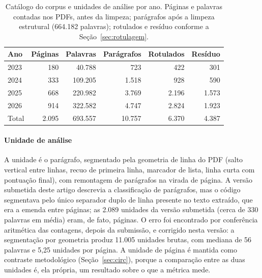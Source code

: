 \documentclass[fleqn,10pt]{SelfArx}
\begin{document}
\begin{table}[hbt]
\caption{Catálogo do corpus e unidades de análise por ano. Páginas e palavras contadas nos PDFs, antes da limpeza; parágrafos após a limpeza estrutural (664.182 palavras); rotulados e resíduo conforme a Seção~\ref{sec:rotulagem}.}
\label{tab:corpus}
\centering
\footnotesize
\begin{tabular}{lrrrrr}
\toprule
Ano & Páginas & Palavras & Parágrafos & Rotulados & Resíduo \\
\midrule
2023 & 180 & 40.788 & 723 & 422 & 301 \\
2024 & 333 & 109.205 & 1.518 & 928 & 590 \\
2025 & 668 & 220.982 & 3.769 & 2.196 & 1.573 \\
2026 & 914 & 322.582 & 4.747 & 2.824 & 1.923 \\
\midrule
Total & 2.095 & 693.557 & 10.757 & 6.370 & 4.387 \\
\bottomrule
\end{tabular}
\end{table}

\paragraph{Unidade de análise} A unidade é o parágrafo, segmentado pela geometria de linha do PDF (salto vertical entre linhas, recuo de primeira linha, marcador de lista, linha curta com pontuação final), com remontagem de parágrafos na virada de página. A versão submetida deste artigo descrevia a classificação de parágrafos, mas o código segmentava pelo único separador duplo de linha presente no texto extraído, que era a emenda entre páginas; as 2.089 unidades da versão submetida (cerca de 330 palavras em média) eram, de fato, páginas. O erro foi encontrado por conferência aritmética das contagens, depois da submissão, e corrigido nesta versão: a segmentação por geometria produz 11.005 unidades brutas, com mediana de 56 palavras e 5,25 unidades por página. A unidade de página é mantida como contraste metodológico (Seção~\ref{sec:circ}), porque a comparação entre as duas unidades é, ela própria, um resultado sobre o que a métrica mede.
\end{document}
